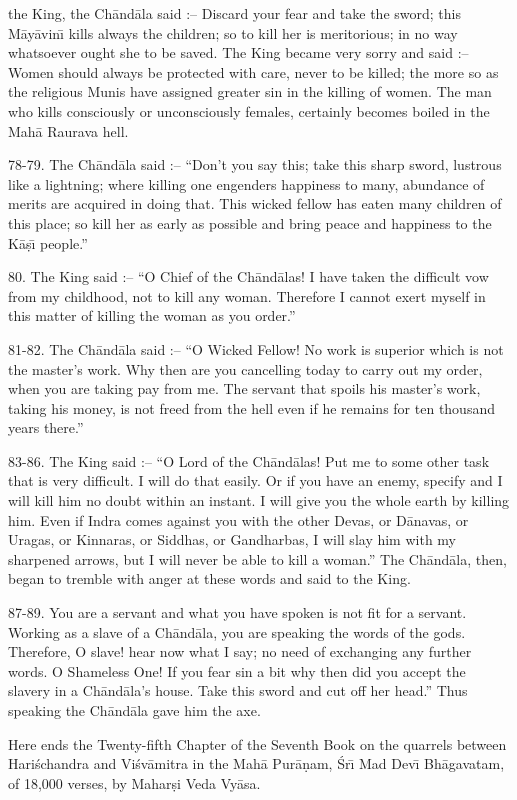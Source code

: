 the King, the Ch\=and\=ala said :-- Discard your fear and take the sword; this M\=ay\=avin\={\i} kills always the children; so to kill her is meritorious; in no way whatsoever ought she to be saved. The King became very sorry and said :-- Women should always be protected with care, never to be killed; the more so as the religious Munis have assigned greater sin in the killing of women. The man who kills consciously or unconsciously females, certainly becomes boiled in the Mah\=a Raurava hell.

78-79. The Ch\=and\=ala said :-- ``Don't you say this; take this sharp sword, lustrous like a lightning; where killing one engenders happiness to many, abundance of merits are acquired in doing that. This wicked fellow has eaten many children of this place; so kill her as early as possible and bring peace and happiness to the K\=a\d{s}\={\i} people.''

80. The King said :-- ``O Chief of the Ch\=and\=alas! I have taken the difficult vow from my childhood, not to kill any woman. Therefore I cannot exert myself in this matter of killing the woman as you order.''

81-82. The Ch\=and\=ala said :-- ``O Wicked Fellow! No work is superior which is not the master's work. Why then are you cancelling today to carry out my order, when you are taking pay from me. The servant that spoils his master's work, taking his money, is not freed from the hell even if he remains for ten thousand years there.''

83-86. The King said :-- ``O Lord of the Ch\=and\=alas! Put me to some other task that is very difficult. I will do that easily. Or if you have an enemy, specify and I will kill him no doubt within an instant. I will give you the whole earth by killing him. Even if Indra comes against you with the other Devas, or D\=anavas, or Uragas, or Kinnaras, or Siddhas, or Gandharbas, I will slay him with my sharpened arrows, but I will never be able to kill a woman.'' The Ch\=and\=ala, then, began to tremble with anger at these words and said to the King.

87-89. You are a servant and what you have spoken is not fit for a servant. Working as a slave of a Ch\=and\=ala, you are speaking the words of the gods. Therefore, O slave! hear now what I say; no need of exchanging any further words. O Shameless One! If you fear sin a bit why then did you accept the slavery in a Ch\=and\=ala's house. Take this sword and cut off her head.'' Thus speaking the Ch\=and\=ala gave him the axe.

Here ends the Twenty-fifth Chapter of the Seventh Book on the quarrels between Hari\'schandra and Vi\'sv\=amitra in the Mah\=a Pur\=a\d{n}am, \'Sr\={\i} Mad Dev\={\i} Bh\=agavatam, of 18,000 verses, by Mahar\d{s}i Veda Vy\=asa.



